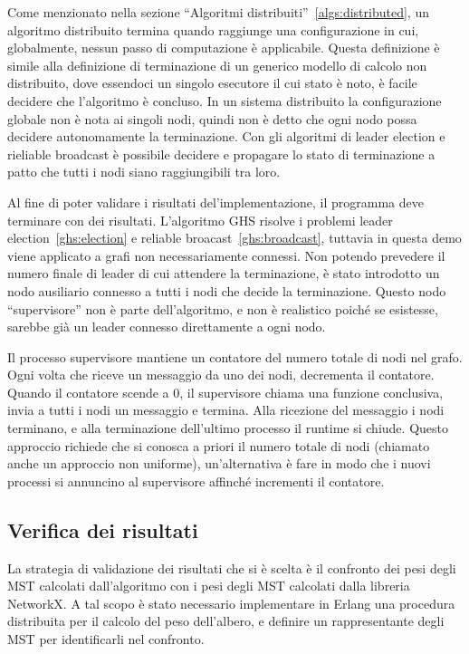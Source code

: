 \documentclass[target=bach,aauheader=,style=]{thud}
\newcommand{\eng}[1]{\foreignlanguage{english}{#1}}
\begin{document}
Come menzionato nella sezione ``Algoritmi distribuiti''~\ref{algs:distributed}, un algoritmo distribuito termina quando raggiunge una configurazione in cui, globalmente, nessun passo di computazione è applicabile. Questa definizione è simile alla definizione di terminazione di un generico modello di calcolo non distribuito, dove essendoci un singolo esecutore il cui stato è noto, è facile decidere che l'algoritmo è concluso. In un sistema distribuito la configurazione globale non è nota ai singoli nodi, quindi non è detto che ogni nodo possa decidere autonomamente la terminazione. Con gli algoritmi di leader \eng{election} e \eng{rieliable broadcast} è possibile decidere e propagare lo stato di terminazione a patto che tutti i nodi siano raggiungibili tra loro.

Al fine di poter validare i risultati del'implementazione, il programma deve terminare con dei risultati. L'algoritmo GHS risolve i problemi leader \eng{election}~\ref{ghs:election} e \eng{reliable broacast}~\ref{ghs:broadcast}, tuttavia in questa demo viene applicato a grafi non necessariamente connessi. Non potendo prevedere il numero finale di leader di cui attendere la terminazione, è stato introdotto un nodo ausiliario connesso a tutti i nodi che decide la terminazione. Questo nodo ``supervisore'' non è parte dell'algoritmo, e non è realistico poiché se esistesse, sarebbe già un leader connesso direttamente a ogni nodo.

Il processo supervisore mantiene un contatore del numero totale di nodi nel grafo. Ogni volta che riceve un messaggio  da uno dei nodi, decrementa il contatore. Quando il contatore scende a $0$, il supervisore chiama una funzione conclusiva, invia a tutti i nodi un messaggio  e termina. Alla ricezione del messaggio  i nodi terminano, e alla terminazione dell'ultimo processo il \eng{runtime} si chiude. Questo approccio richiede che si conosca a priori il numero totale di nodi (chiamato anche un approccio non uniforme), un'alternativa è fare in modo che i nuovi processi si annuncino al supervisore affinché incrementi il contatore.

\subsection{Verifica dei risultati}\label{impl:verify}

La strategia di validazione dei risultati che si è scelta è il confronto dei pesi degli MST calcolati dall'algoritmo con i pesi degli MST calcolati dalla libreria NetworkX. A tal scopo è stato necessario implementare in Erlang una procedura distribuita per il calcolo del peso dell'albero, e definire un rappresentante degli MST per identificarli nel confronto.
\end{document}
